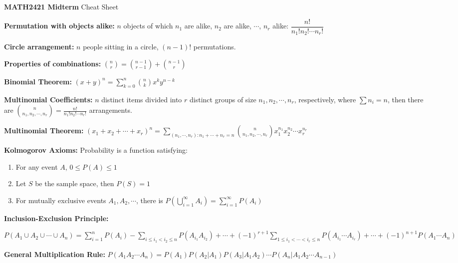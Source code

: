 \documentclass[10pt, a4paper]{article}
\newcommand{\disp}{\displaystyle}
\begin{document}
\begin{spacing}{1}
    \begin{center}
        {\bf MATH2421 Midterm} Cheat Sheet
    \end{center}
    \setlength{\parindent}{0em}
    \parskip=6pt

    {\bf Permutation with objects alike:} $n$ objects of which $n_1$ are alike,
    $n_2$ are alike, $\cdots$, $n_r$ alike: $\dfrac{n!}{n_1!n_2!\cdots n_r!}$

    {\bf Circle arrangement:} $n$ people sitting in a circle, $(n-1)!$ permutations.

    {\bf Properties of combinations:} $\disp {n\choose r}={n-1\choose r-1}+{n-1\choose r}$

    {\bf Binomial Theorem:} $\disp (x+y)^n=\sum_{k=0}^{n}{n\choose k} x^k y^{n-k}$

    {\bf Multinomial Coefficients:} $n$ distinct items divided into $r$ distinct groups of 
    size $n_1,n_2,\cdots,n_r$, respectively, where $\sum n_{i}=n$, then there are 
    $\disp {n\choose n_1,n_2,\cdots,n_r}=\frac{n!}{n_1!n_2!\cdots n_r!}$ arrangements.

    {\bf Multinomial Theorem:} $\disp (x_1+x_2+\cdots +x_r)^n=\sum_{(n_1,\cdots ,n_r):n_1+\cdots +n_r=n}
    {n\choose n_1,n_2,\cdots ,n_r}x_1^{n_1}x_2^{n_2}\cdots x_r^{n_r}$

    \vspace{0.3in}

    {\bf Kolmogorov Axioms:} Probability is a function satisfying: 
    \begin{enumerate}
        \item For any event $A$, $0\le P(A)\le 1$
        \item Let $S$ be the sample space, then $P(S)=1$
        \item For mutually exclusive events $A_1,A_2,\cdots$, there is $\disp P\left(\bigcup_{i=1}^{\infty}A_i\right)
        =\sum_{i=1}^{\infty}P(A_i)$
    \end{enumerate}
    {\bf Inclusion-Exclusion Principle:} 

    $\disp P(A_1\cup A_2\cup \cdots \cup A_n)=
    \sum_{i=1}^{n}P(A_i)-\sum_{i\le i_1<i_2\le n}P(A_{i_1}A_{i_2})+\cdots +
    (-1)^{r+1}\sum_{1\le i_1<\cdots<i_r\le n}P(A_{i_1}\cdots A_{i_r})+\cdots +
    (-1)^{n+1}P(A_1\cdots A_n)$

    \vspace{0.3in}
    {\bf General Multiplication Rule:} $P(A_1A_2\cdots A_n)=
    P(A_1)P(A_2|A_1)P(A_3|A_1A_2)\cdots P(A_n|A_1A_2\cdots A_{n-1})$


\end{spacing}
\end{document}
